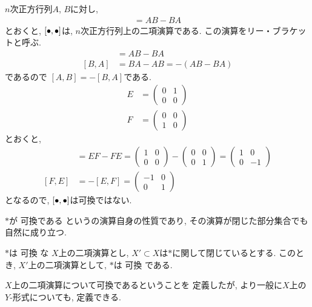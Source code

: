 \begin{nonexample}
  $n$次正方行列$A$, $B$に対し,
  \begin{align*}
    [A,B]=AB-BA
  \end{align*}
  とおくと,
  $[{\bullet},{\bullet}]$は,
  $n$次正方行列上の二項演算である.
  この演算をリー・ブラケットと呼ぶ.
  \begin{align*}
    [A,B]&=AB-BA\\
    [B,A]&=BA-AB=-(AB-BA)
  \end{align*}
  であるので
  $[A,B]=-[B,A]$である.
  \begin{align*}
    E&=\begin{pmatrix}0&1\\0&0\end{pmatrix}\\
    F&=\begin{pmatrix}0&0\\1&0\end{pmatrix}
  \end{align*}
  とおくと,
  \begin{align*}
    [E,F]&=EF-FE=
    \begin{pmatrix}
      1&0\\0&0
    \end{pmatrix}
    -
    \begin{pmatrix}
      0&0\\0&1
    \end{pmatrix}
    =
    \begin{pmatrix}
      1&0\\0&-1
    \end{pmatrix}\\
    [F,E]&=-[E,F]=
    \begin{pmatrix}
      -1&0\\0&1
    \end{pmatrix}
  \end{align*}
  となるので, $[{\bullet},{\bullet}]$は可換ではない.
\end{nonexample}

$\ast$が
可換である
というの演算自身の性質であり,
その演算が閉じた部分集合でも自然に成り立つ.
\begin{prop}
  $\ast$は
  可換
  な
  $X$上の二項演算とし,
  $X'\subset X$は$\ast$に関して閉じているとする.
  このとき,
  $X'$上の二項演算として,
  $\ast$は
  可換
  である.
\end{prop}

$X$上の二項演算について可換であるということを
定義したが,
より一般に$X$上の$Y$-形式についても,
定義できる.

